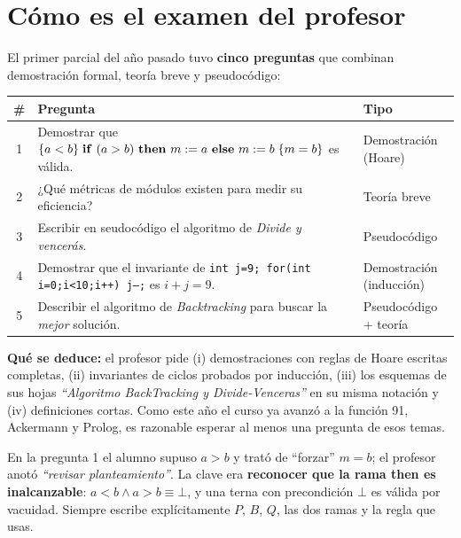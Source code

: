 \newpage
\section*{Cómo es el examen del profesor}

El primer parcial del año pasado tuvo \textbf{cinco preguntas} que combinan demostración formal, teoría breve y pseudocódigo:

\begin{center}
\begin{tabular}{@{}c p{10.4cm} p{3.9cm}@{}}
\toprule
\# & Pregunta & Tipo \\ \midrule
1 & Demostrar que $\{a<b\}\;\mathbf{if}\ (a>b)\ \mathbf{then}\ m\mathrel{:=} a\ \mathbf{else}\ m\mathrel{:=} b\;\{m=b\}$ es válida. & Demostración (Hoare) \\
2 & ¿Qué métricas de módulos existen para medir su eficiencia? & Teoría breve \\
3 & Escribir en seudocódigo el algoritmo de \emph{Divide y vencerás}. & Pseudocódigo \\
4 & Demostrar que el invariante de \texttt{int j=9; for(int i=0;i<10;i++) j--;} es $i+j=9$. & Demostración (inducción) \\
5 & Describir el algoritmo de \emph{Backtracking} para buscar la \emph{mejor} solución. & Pseudocódigo + teoría \\
\bottomrule
\end{tabular}
\end{center}

\textbf{Qué se deduce:} el profesor pide (i) demostraciones con reglas de Hoare escritas completas, (ii) invariantes de ciclos probados por inducción, (iii) los esquemas de sus hojas \emph{``Algoritmo BackTracking y Divide-Venceras''} en su misma notación y (iv) definiciones cortas. Como este año el curso ya avanzó a la función 91, Ackermann y Prolog, es razonable esperar al menos una pregunta de esos temas.

\begin{consejo}
En la pregunta 1 el alumno supuso $a>b$ y trató de ``forzar'' $m=b$; el profesor anotó \emph{``revisar planteamiento''}. La clave era \textbf{reconocer que la rama \textbf{then} es inalcanzable}: $a<b \land a>b\equiv\bot$, y una terna con precondición $\bot$ es válida por vacuidad. Siempre escribe explícitamente $P$, $B$, $Q$, las dos ramas y la regla que usas.
\end{consejo}

